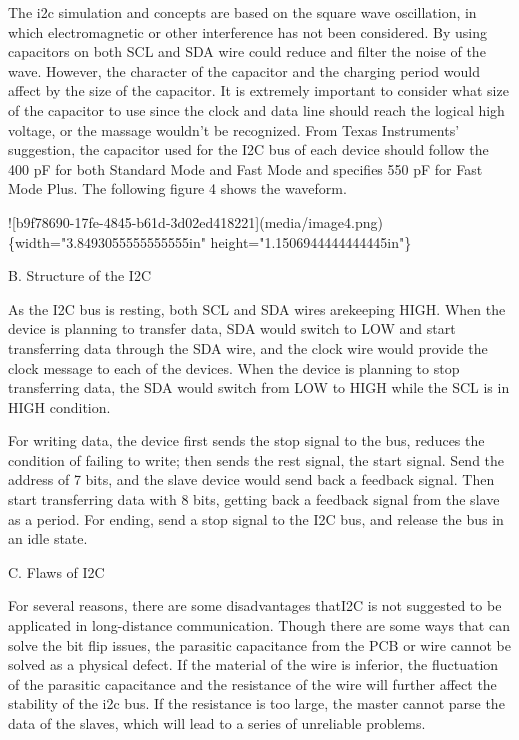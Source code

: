 \documentclass[12pt,a4paper]{article}
\numberwithin{equation}{section}
\begin{document}
    The i2c simulation and concepts are based on the square wave
    oscillation, in which electromagnetic or other interference has not
    been considered. By using capacitors on both SCL and SDA wire could
    reduce and filter the noise of the wave. However, the character of
    the capacitor and the charging period would affect by the size of
    the capacitor. It is extremely important to consider what size of
    the capacitor to use since the clock and data line should reach the
    logical high voltage, or the massage wouldn't be recognized. From
    Texas Instruments' suggestion, the capacitor used for the I2C bus of
    each device should follow the 400 pF for both Standard Mode and Fast
    Mode and specifies 550 pF for Fast Mode Plus. The following figure 4
    shows the waveform.

    ![b9f78690-17fe-4845-b61d-3d02ed418221](media/image4.png)\{width="3.8493055555555555in"
    height="1.1506944444444445in"\}

B.  Structure of the I2C

    As the I2C bus is resting, both SCL and SDA wires arekeeping HIGH.
    When the device is planning to transfer data, SDA would switch to
    LOW and start transferring data through the SDA wire, and the clock
    wire would provide the clock message to each of the devices. When
    the device is planning to stop transferring data, the SDA would
    switch from LOW to HIGH while the SCL is in HIGH condition.

    For writing data, the device first sends the stop signal to the bus,
    reduces the condition of failing to write; then sends the rest
    signal, the start signal. Send the address of 7 bits, and the slave
    device would send back a feedback signal. Then start transferring
    data with 8 bits, getting back a feedback signal from the slave as a
    period. For ending, send a stop signal to the I2C bus, and release
    the bus in an idle state.

C.  Flaws of I2C

    For several reasons, there are some disadvantages thatI2C is not
    suggested to be applicated in long-distance communication. Though
    there are some ways that can solve the bit flip issues, the
    parasitic capacitance from the PCB or wire cannot be solved as a
    physical defect. If the material of the wire is inferior, the
    fluctuation of the parasitic capacitance and the resistance of the
    wire will further affect the stability of the i2c bus. If the
    resistance is too large, the master cannot parse the data of the
    slaves, which will lead to a series of unreliable problems.
\end{document}
